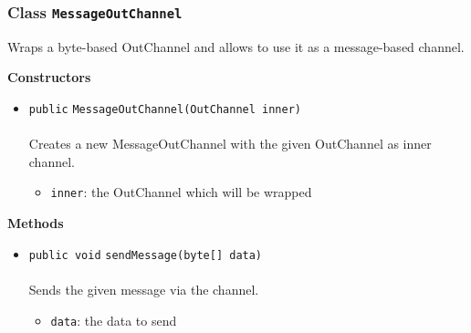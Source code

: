 \subsubsection{Class \lstinline|MessageOutChannel|}
Wraps a byte-based OutChannel and allows to use it as a message-based
 channel. \\
\noindent\begin{minipage}[t]{5cm}
\vspace{0.3em}
\hspace*{2em}
\vspace{0.3em}
\end{minipage}




\textbf{\sffamily Constructors}
\begin{itemize}
\item \lstinline|public| \lstinline|MessageOutChannel|\lstinline|(OutChannel inner)|\\ \\[-0.6em]
Creates a new MessageOutChannel with the given OutChannel as inner channel.
\begin{itemize}
\item \lstinline|inner|: the OutChannel which will be wrapped
\end{itemize}



\end{itemize}


\textbf{\sffamily Methods}
\begin{itemize}
\item \lstinline|public void| \lstinline|sendMessage|\lstinline|(byte[] data)|\\ \\[-0.6em]
Sends the given message via the channel.
\begin{itemize}
\item \lstinline|data|: the data to send
\end{itemize}



\end{itemize}

